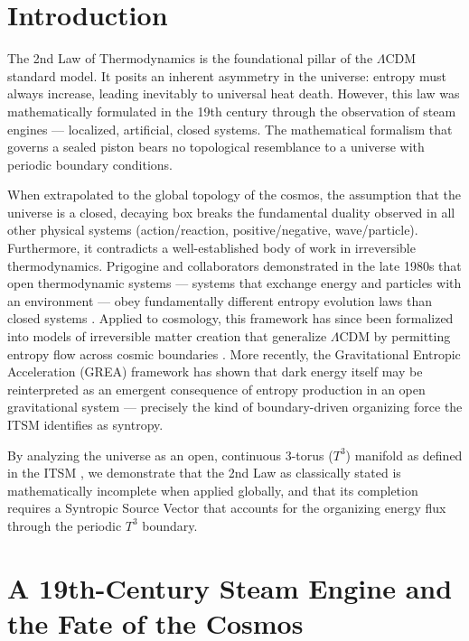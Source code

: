 \documentclass[aps,prd,11pt,onecolumn,superscriptaddress,nofootinbib,floatfix]{revtex4-2}
\begin{document}
\section{Introduction}
\label{sec:intro}

The 2nd Law of Thermodynamics is the foundational pillar of the $\Lambda$CDM standard model. It posits an inherent asymmetry in the universe: entropy must always increase, leading inevitably to universal heat death. However, this law was mathematically formulated in the 19th century through the observation of steam engines --- localized, artificial, closed systems. The mathematical formalism that governs a sealed piston bears no topological resemblance to a universe with periodic boundary conditions.

When extrapolated to the global topology of the cosmos, the assumption that the universe is a closed, decaying box breaks the fundamental duality observed in all other physical systems (action/reaction, positive/negative, wave/particle). Furthermore, it contradicts a well-established body of work in irreversible thermodynamics. Prigogine and collaborators demonstrated in the late 1980s that open thermodynamic systems --- systems that exchange energy and particles with an environment --- obey fundamentally different entropy evolution laws than closed systems \cite{prigogine_1989}. Applied to cosmology, this framework has since been formalized into models of irreversible matter creation that generalize $\Lambda$CDM by permitting entropy flow across cosmic boundaries \cite{open_systems_2023}. More recently, the Gravitational Entropic Acceleration (GREA) framework \cite{grea_2024} has shown that dark energy itself may be reinterpreted as an emergent consequence of entropy production in an open gravitational system --- precisely the kind of boundary-driven organizing force the ITSM identifies as syntropy.

By analyzing the universe as an open, continuous 3-torus ($T^3$) manifold as defined in the ITSM \cite{itsm_main}, we demonstrate that the 2nd Law as classically stated is mathematically incomplete when applied globally, and that its completion requires a Syntropic Source Vector that accounts for the organizing energy flux through the periodic $T^3$ boundary.


\section{A 19th-Century Steam Engine and the Fate of the Cosmos}
\label{sec:steam_engine}
\end{document}
